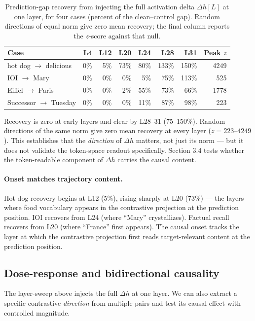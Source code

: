 \documentclass[11pt]{article}
\newcommand{\dhh}{\Delta h}
\begin{document}
\begin{table}[htbp]
\centering
\small
\begin{tabular}{lrrrrrrr}
\toprule
Case & L4 & L12 & L20 & L24 & L28 & L31 & Peak $z$ \\
\midrule
hot dog $\rightarrow$ delicious & 0\% & 5\% & 73\% & 80\% & 133\% & 150\% & 4249 \\
IOI $\rightarrow$ Mary & 0\% & 0\% & 0\% & 5\% & 75\% & 113\% & 525 \\
Eiffel $\rightarrow$ Paris & 0\% & 0\% & 2\% & 55\% & 73\% & 66\% & 1778 \\
Successor $\rightarrow$ Tuesday & 0\% & 0\% & 0\% & 11\% & 87\% & 98\% & 223 \\
\bottomrule
\end{tabular}
\caption{Prediction-gap recovery from injecting the full activation delta $\dhh[L]$ at one layer, for four cases (percent of the clean--control gap). Random directions of equal norm give zero mean recovery; the final column reports the $z$-score against that null.}
\label{tab:recovery}
\end{table}

Recovery is zero at early layers and clear by L28--31 (75--150\%).
Random directions of the same norm give zero mean recovery at every layer
($z = 223$--$4249$). This establishes that the \emph{direction} of $\dhh$ matters, not
just its norm --- but it does not validate the token-space readout
specifically. Section 3.4 tests whether the token-readable component of $\dhh$
carries the causal content.

\paragraph{Onset matches trajectory content.} Hot dog recovery begins at L12 (5\%),
rising sharply at L20 (73\%) --- the layers where food vocabulary appears in the
contrastive projection at the prediction position. IOI recovers from L24
(where ``Mary'' crystallizes). Factual recall recovers from L20 (where ``France''
first appears). The causal onset tracks the layer at which the contrastive
projection first reads target-relevant content at the prediction position.

\subsection{Dose-response and bidirectional causality}

The layer-sweep above injects the full $\dhh$ at one layer. We can also extract a
specific contrastive \emph{direction} from multiple pairs and test its causal effect
with controlled magnitude.
\end{document}
